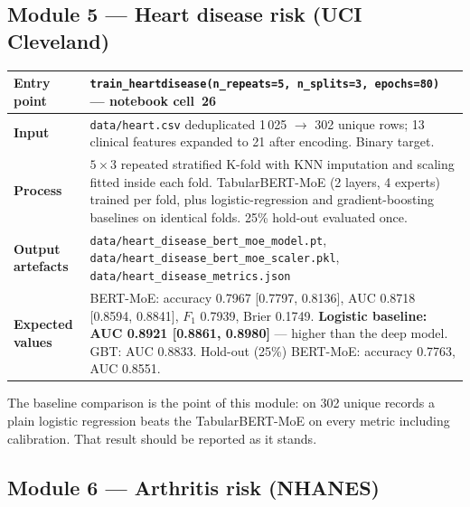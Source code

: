 \documentclass[11pt,a4paper]{article}
\newcommand{\code}[1]{\texttt{\small #1}}
\begin{document}
\subsection{Module 5 --- Heart disease risk (UCI Cleveland)}

\begin{table}[!ht]
\centering
\small
\begin{tabular}{@{}p{2.4cm}p{12.4cm}@{}}
\toprule
\textbf{Entry point} & \code{train\_heartdisease(n\_repeats=5, n\_splits=3,
epochs=80)} --- notebook cell~26\\
\midrule
\textbf{Input} & \code{data/heart.csv} deduplicated 1\,025
$\rightarrow$ 302 unique rows; 13 clinical features expanded to 21 after
encoding. Binary target.\\
\addlinespace
\textbf{Process} & $5\times3$ repeated stratified K-fold with KNN
imputation and scaling fitted inside each fold. TabularBERT-MoE
(2 layers, 4 experts) trained per fold, plus logistic-regression and
gradient-boosting baselines on identical folds. 25\% hold-out evaluated
once.\\
\addlinespace
\textbf{Output artefacts} & \code{data/heart\_disease\_bert\_moe\_model.pt},
\newline\code{data/heart\_disease\_bert\_moe\_scaler.pkl},
\newline\code{data/heart\_disease\_metrics.json}\\
\addlinespace
\textbf{Expected values} &
BERT-MoE: accuracy 0.7967 [0.7797, 0.8136], AUC 0.8718 [0.8594, 0.8841],
$F_1$ 0.7939, Brier 0.1749.
\textbf{Logistic baseline: AUC 0.8921 [0.8861, 0.8980]} --- higher than the
deep model. GBT: AUC 0.8833. Hold-out (25\%) BERT-MoE: accuracy 0.7763,
AUC 0.8551.\\
\bottomrule
\end{tabular}
\end{table}

\noindent
The baseline comparison is the point of this module: on 302 unique records
a plain logistic regression beats the TabularBERT-MoE on every metric
including calibration. That result should be reported as it stands.

\subsection{Module 6 --- Arthritis risk (NHANES)}
\end{document}
